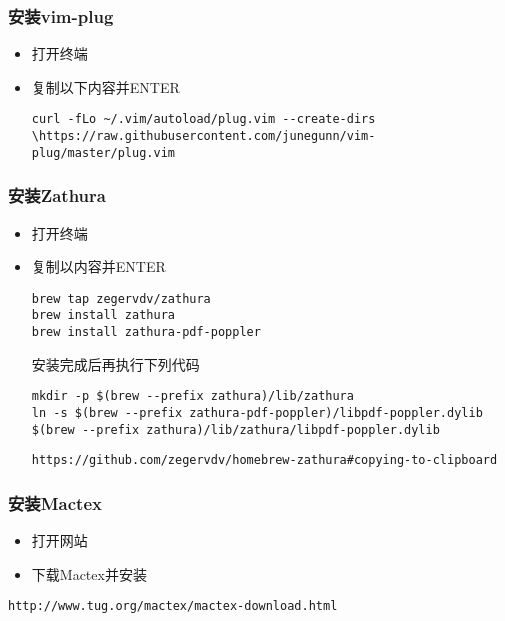 \documentclass[UTF_8]{ctexart}
\begin{document}
\subsubsection{安装vim-plug}
\begin{itemize}
		\item 打开终端
		\item 复制以下内容并ENTER
\begin{lstlisting}[frame=shadowbox]
curl -fLo ~/.vim/autoload/plug.vim --create-dirs \https://raw.githubusercontent.com/junegunn/vim-plug/master/plug.vim
\end{lstlisting}

\small
\heiti
{}
\small
\heiti
{}

\end{itemize}

\subsubsection{安装Zathura}
\begin{itemize}
		\item 打开终端
		\item 复制以内容并ENTER
\begin{lstlisting}[frame=shadowbox]
brew tap zegervdv/zathura
brew install zathura
brew install zathura-pdf-poppler
\end{lstlisting}
安装完成后再执行下列代码
\begin{lstlisting}[frame=shadowbox]
mkdir -p $(brew --prefix zathura)/lib/zathura
ln -s $(brew --prefix zathura-pdf-poppler)/libpdf-poppler.dylib $(brew --prefix zathura)/lib/zathura/libpdf-poppler.dylib
\end{lstlisting}
\small
\heiti
{}
\begin{lstlisting}[frame=shadowbox]
https://github.com/zegervdv/homebrew-zathura#copying-to-clipboard
\end{lstlisting}
		
\end{itemize}

\subsubsection{安装Mactex}
\begin{itemize}
		\item 打开网站
		\item 下载Mactex并安装 
		
\end{itemize}
\begin{lstlisting}[frame=shadowbox]
http://www.tug.org/mactex/mactex-download.html
\end{lstlisting}
\end{document}
